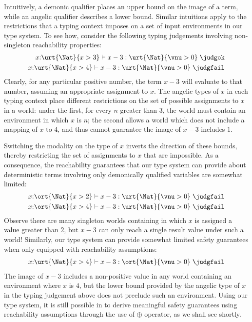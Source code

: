 Intuitively, a demonic qualifier places an upper bound on the image of
a term, while an angelic qualifier describes a lower bound. Similar
intuitions apply to the restrictions that a typing context imposes on
a set of input environments in our type system. To see how,%
consider the following typing judgements involving non-singleton
reachability properties: %
\begin{align*}
  x{:}\urt{\Nat}{x > 3} \vdash x - 3 : \urt{\Nat}{\vnu > 0}\;\judgok \\
  x{:}\urt{\Nat}{x > 4} \vdash x - 3 : \urt{\Nat}{\vnu > 0}\;\judgfail
\end{align*} %
\noindent
Clearly, for any particular positive number, the term $x - 3$ will
evaluate to that number, assuming an appropriate assignment to
$x$. The angelic types of $x$ in each typing context place different
restrictions on the set of possible assignments to $x$ in a world:
under the first, for every $n$ greater than $3$, the world must
contain an environment in which $x$ is $n$; the second allows a world
which does not include a mapping of $x$ to $4$, and thus cannot
guarantee the image of $x - 3$ includes $1$.

Switching the modality on the type of $x$ inverts the direction of
these bounds, thereby restricting the set of assignments to $x$ that
are impossible. As a consequence, the reachability guarantees that our
type system can provide about deterministic terms involving only
demonically qualified variables are somewhat limited:
\begin{align*}
  x{:}\ort{\Nat}{x > 2} \vdash x - 3 : \urt{\Nat}{\vnu > 0}\;\judgfail \\
  x{:}\ort{\Nat}{x > 4} \vdash x - 3 : \urt{\Nat}{\vnu > 0}\;\judgfail
\end{align*} %
Observe there are many singleton worlds containing in which $x$ is
assigned a value greater than $2$, but $x - 3$ can only reach a single
result value under such a world!
Similarly, our type system can provide somewhat limited safety
guarantees when only equipped with reachability assumptions:
\begin{align*}
  x{:}\urt{\Nat}{x > 4} \vdash x - 3 : \ort{\Nat}{\vnu > 0}\;\judgfail \\
\end{align*} %
The image of $x - 3$ includes a non-positive value in any world
containing an environment where $x$ is $4$, but the lower bound
provided by the angelic type of $x$ in the typing judgement above does
not preclude such an environment. Using our type system, it is still
possible in to derive meaningful safety guarantees using reachability
assumptions through the use of $\oplus$ operator, as we shall see
shortly.


